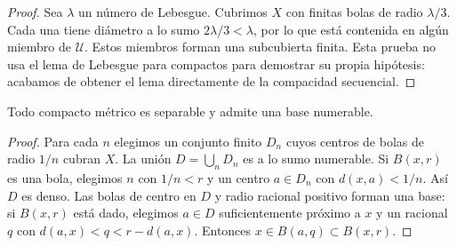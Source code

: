\begin{proof}
Sea $\lambda$ un número de Lebesgue. Cubrimos $X$ con finitas bolas de radio $\lambda/3$. Cada una tiene diámetro a lo sumo $2\lambda/3<\lambda$, por lo que está contenida en algún miembro de $\mathcal U$. Estos miembros forman una subcubierta finita. Esta prueba no usa el lema de Lebesgue para compactos para demostrar su propia hipótesis: acabamos de obtener el lema directamente de la compacidad secuencial.
\end{proof}

\begin{corolario}\label{ch14:separable}
Todo compacto métrico es separable y admite una base numerable.
\end{corolario}
\begin{proof}
Para cada $n$ elegimos un conjunto finito $D_n$ cuyos centros de bolas de radio $1/n$ cubran $X$. La unión $D=\bigcup_nD_n$ es a lo sumo numerable. Si $B(x,r)$ es una bola, elegimos $n$ con $1/n<r$ y un centro $a\in D_n$ con $d(x,a)<1/n$. Así $D$ es denso. Las bolas de centro en $D$ y radio racional positivo forman una base: si $B(x,r)$ está dado, elegimos $a\in D$ suficientemente próximo a $x$ y un racional $q$ con $d(a,x)<q<r-d(a,x)$. Entonces $x\in B(a,q)\subset B(x,r)$.
\end{proof}

